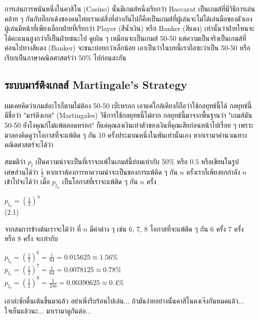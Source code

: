 \documentclass{article}
\begin{document}
การเล่นการพนันหนึ่งในคาสิโน (Casino) นั้นมีเกมส์หนึ่งเรียกว่า Baccarat เป็นเกมส์ที่มีวิธีการเล่นคล้าย ๆ กันกับป๊อกเด้งของคนไทยเราแต่สิ่งที่ต่างกันไปก็คือเป็นเกมส์ที่ผู้เล่นจะไม่ได้เล่นมือของตัวเอง ผู้เล่นมีหน้าที่เพียงเลือกฝ่ายที่เรียกว่า Player (สีน้ำเงิน) หรือ Banker (สีแดง) เท่านั้นว่าฝ่ายไหนจะได้คะแนนสูงกว่าก็เป็นฝ่ายชนะไป ดูเผิน ๆ เหมือนจะเป็นเกมส์ 50-50 แต่ความเป็นจริงเป็นเกมส์ที่ค่อนไปทางสีแดง (Banker) จะชนะบ่อยกว่าเล็กน้อย เอาเป็นว่าในบทนี้เราถือซะว่าเป็น 50-50 หรือเรียกเป็นภาษาคณิตศาสตร์ว่า 50\% ไปก่อนละกัน

\subsection{ระบบมาร์ติงเกลส์ Martingale's Strategy}
ผมเคยคิดว่าเกมส์อะไรก็ตามไม่ต้อง 50-50 เป๊ะหรอก เอาแค่ใกล้เคียงก็ถือว่าใช้กลยุทธ์นี้ได้ กลยุทธ์นี้มีชื่อว่า "มาร์ติงเกล" (Martingales) วิธีการใช้กลยุทธนี้ไม่ยาก กลยุทธ์นี้มาจากพื้นฐานว่า "เกมส์มัน 50-50 ยังไงคุณก้ไม่แพ้ตลอดหรอก" ก็แค่คุณลงเงินเท่าตัวของเงินที่คุณเสียก่อนหน้าไปเรื่อย ๆ เพราะมาลองคิดดูว่าโอกาสที่จะแพ้ติด ๆ กัน 10 ครั้งประมาณหนึ่งในพันเท่านั้นเอง หากเรามาคำนวณทางคณิตศาสตร์จะได้ว่า

สมมติว่า $p_l$ เป็นความน่าจะเป็นที่เราจะแพ้ในเกมส์นี้ย่อมเท่ากับ 50\% หรือ $0.5$ หรือเขียนในรูปเศษส่วนได้ว่า $\frac{1}{2}$ หากเราต้องการหาความน่าจะเป็นของการแพ้ติด ๆ กัน $n$ ครั้งเราก็เพียงยกกำลัง $n$ เข้าไปจะได้ว่า เมื่อ $p_{l_n}$ เป็นโอกาสที่เราจะแพ้ติด ๆ กัน $n$ ครั้ง
\begin{center}
$p_{l_n} = (\frac{1}{2})^n$ \\
(2.1)
\end{center}
จากสมการข้างต้นเราจะได้ว่า ที่ $n$ มีค่าต่าง ๆ เช่น 6, 7, 8 โอกาสที่จะแพ้ติด ๆ กัน 6 ครั้ง 7 ครั้ง หรือ 8 ครั้ง จะเท่ากับ
\begin{center}
$p_{l_6}=(\frac{1}{2})^6=\frac{1}{64}=0.015625\approx1.56\%$\\
$p_{l_7}=(\frac{1}{2})^7=\frac{1}{64}=0.0078125\approx0.78\%$\\
$p_{l_8}=(\frac{1}{2})^8=\frac{1}{256}=0.00390625\approx0.4\%$\\ 
\end{center}
เอาล่ะชักตื่นเต้นขึ้นมาแล้ว อย่าเพิ่งรีบร้อนไปเล่น... ถ้ามันง่ายอย่างนั้นคาสิโนคงเจ๊งกันหมดแล้ว... ใจเย็นแล้วนะ... มาเรามาดูกันต่อ... 
\end{document}
